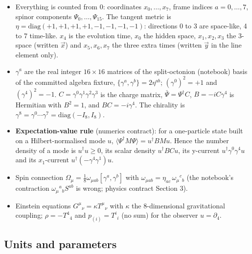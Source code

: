 \documentclass[11pt]{article}
\begin{document}
\begin{itemize}
\item Everything is counted from 0: coordinates $x_0,\dots,x_7$, frame indices $a=0,\dots,7$, spinor components $\Psi_0,\dots,\Psi_{15}$. The tangent metric is $\eta=\mathrm{diag}(+1,+1,+1,+1,-1,-1,-1,-1)$: directions 0 to 3 are space-like, 4 to 7 time-like. $x_4$ is the evolution time, $x_0$ the hidden space, $x_1,x_2,x_3$ the 3-space (written $\vec x$) and $x_5,x_6,x_7$ the three extra times (written $\vec y$ in the line element only).
\item $\gamma^a$ are the real integer $16\times16$ matrices of the split-octonion (notebook) basis of the committed algebra fixture, $\{\gamma^a,\gamma^b\}=2\eta^{ab}$; $(\gamma^0)^2=+1$ and $(\gamma^4)^2=-1$. $C=\gamma^0\gamma^1\gamma^2\gamma^3$ is the charge matrix, $\bar\Psi=\Psi^\dagger C$, $B=-iC\gamma^4$ is Hermitian with $B^2=1$, and $BC=-i\gamma^4$. The chirality is $\gamma^8=\gamma^0\cdots\gamma^7=\mathrm{diag}(-I_8,I_8)$.
\item \textbf{Expectation-value rule} (numerics contract): for a one-particle state built on a Hilbert-normalised mode $u$, $\langle\Psi^\dagger M\Psi\rangle=u^\dagger BMu$. Hence the number density of a mode is $u^\dagger u\ge0$, its scalar density $u^\dagger BCu$, its y-current $u^\dagger\gamma^0\gamma^4u$ and its $x_1$-current $u^\dagger(-\gamma^4\gamma^1)u$.
\item Spin connection $\Omega_\mu=\tfrac18\omega_{\mu ab}[\gamma^a,\gamma^b]$ with $\omega_{\mu ab}=\eta_{ac}\,\omega_\mu{}^c{}_b$ (the notebook's contraction $\omega_\mu{}^a{}_bS^{ab}$ is wrong; physics contract Section 3).
\item Einstein equations $G^\mu{}_\nu=\kappa T^\mu{}_\nu$ with $\kappa$ the 8-dimensional gravitational coupling; $\rho=-T^4{}_4$ and $p_{(i)}=T^i{}_i$ (no sum) for the observer $u=\partial_4$.
\end{itemize}

\subsection{Units and parameters}
\end{document}
